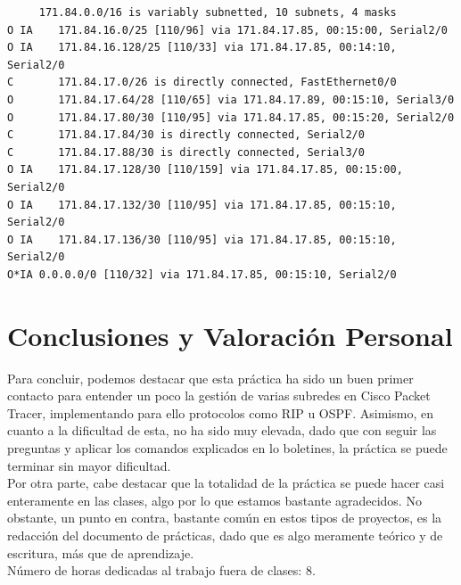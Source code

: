 \documentclass[twoside, 11pt]{article}
\begin{document}
\begin{enumerate}
\begin{center}
\begin{verbatim}
     171.84.0.0/16 is variably subnetted, 10 subnets, 4 masks
O IA    171.84.16.0/25 [110/96] via 171.84.17.85, 00:15:00, Serial2/0
O IA    171.84.16.128/25 [110/33] via 171.84.17.85, 00:14:10, Serial2/0
C       171.84.17.0/26 is directly connected, FastEthernet0/0
O       171.84.17.64/28 [110/65] via 171.84.17.89, 00:15:10, Serial3/0
O       171.84.17.80/30 [110/95] via 171.84.17.85, 00:15:20, Serial2/0
C       171.84.17.84/30 is directly connected, Serial2/0
C       171.84.17.88/30 is directly connected, Serial3/0
O IA    171.84.17.128/30 [110/159] via 171.84.17.85, 00:15:00, Serial2/0
O IA    171.84.17.132/30 [110/95] via 171.84.17.85, 00:15:10, Serial2/0
O IA    171.84.17.136/30 [110/95] via 171.84.17.85, 00:15:10, Serial2/0
O*IA 0.0.0.0/0 [110/32] via 171.84.17.85, 00:15:10, Serial2/0
\end{verbatim}
\label{list:2.2.4.2}
\end{center}
\end{enumerate}

\newpage

\section{Conclusiones y Valoración Personal}

Para concluir, podemos destacar que esta práctica ha sido un buen primer contacto para entender un poco la gestión de varias subredes en Cisco Packet Tracer, implementando para ello protocolos como RIP u OSPF. Asimismo, en cuanto a la dificultad de esta, no ha sido muy elevada, dado que con seguir las preguntas y aplicar los comandos explicados en lo boletines, la práctica se puede terminar sin mayor dificultad. \\

Por otra parte, cabe destacar que la totalidad de la práctica se puede hacer casi enteramente en las clases, algo por lo que estamos bastante agradecidos. No obstante, un punto en contra, bastante común en estos tipos de proyectos, es la redacción del documento de prácticas, dado que es algo meramente teórico y de escritura, más que de aprendizaje.\\

Número de horas dedicadas al trabajo fuera de clases: 8.

\newpage

\listoftables

\listoflistings

\listoffigures
\end{document}

